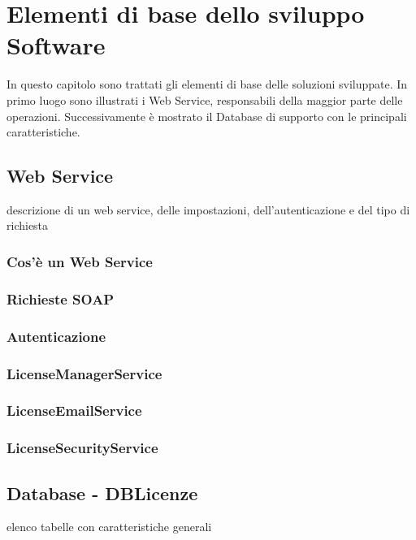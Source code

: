 
\chapter{Elementi di base dello sviluppo Software}
\label{cap:sviluppo-software}

In questo capitolo sono trattati gli elementi di base delle soluzioni sviluppate. In primo luogo sono illustrati i Web Service, responsabili della maggior parte delle operazioni. Successivamente è mostrato il Database di supporto con le principali caratteristiche.


\section{Web Service}

descrizione di un web service, delle impostazioni, dell'autenticazione e del tipo di richiesta
\subsection{Cos'è un Web Service}

\subsection{Richieste SOAP}

\subsection{Autenticazione}

\subsection{LicenseManagerService}

\subsection{LicenseEmailService}

\subsection{LicenseSecurityService}


\section{Database - DBLicenze}

elenco tabelle con caratteristiche generali
